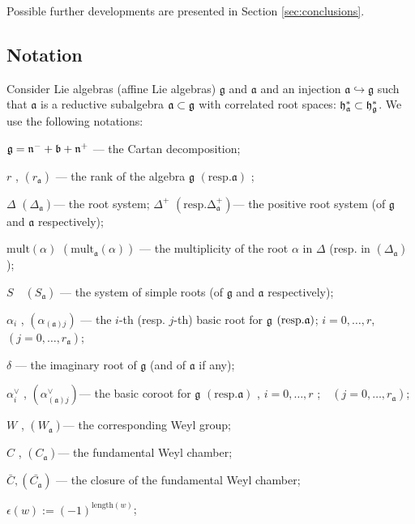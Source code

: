 \documentclass[12pt]{article}
\theoremstyle{definition}
\newcommand{\gf}{\mathfrak{g}}
\newcommand{\af}{\mathfrak{a}}
\begin{document}
Possible further developments are presented in Section \ref{sec:conclusions}.

\subsection{Notation}

\label{sec:notation}

Consider Lie algebras (affine Lie algebras) $\gf$ and $\af$ and an
injection $\af\hookrightarrow \gf$ such that $\af$ is a
reductive subalgebra $\frak{a\subset g}$ with correlated root spaces: $\frak{%
h}_{\af}^{\ast }\subset \frak{h}_{\gf}^{\ast }$. We use the
following notations:

$\frak{g=n}^{-}+\frak{b}+\frak{n}^{+}$ --- the Cartan decomposition;

$r$ , $\left( r_{\af}\right) $ --- the rank of the algebra $\gf$ $%
\left( \mathrm{{resp. }\af}\right) $ ;

$\Delta $ $\left( \Delta _{\af}\right) $--- the root system; $\Delta
^{+} $ $\left( \mathrm{{resp. }\Delta _{\af}^{+}}\right) $--- the
positive root system (of $\gf$ and $\af$ respectively);

$\mathrm{mult}\left( \alpha \right) $ $\left( \mathrm{mult}_{\af}\left(
\alpha \right) \right) $ --- the multiplicity of the root $\alpha$ in $%
\Delta $ (resp. in $\left( \Delta _{\af}\right) $);

$S\quad \left( S_{\af}\right) $ --- the system of simple roots (of $%
\gf$ and $\af$ respectively);

$\alpha _{i}$ , $\left( \alpha _{\left( \af\right) j}\right) $ --- the $%
i$-th (resp. $j$-th) basic root for $\gf$ $\left( \mathrm{{resp.}\frak{a%
}}\right) $; $i=0,\ldots ,r$,\ \ $\left( j=0,\ldots ,r_{\af}\right) $;

$\delta $ --- the imaginary root of $\gf$ (and of $\af$ if any);

$\alpha _{i}^{\vee }$ , $\left( \alpha _{\left( \af\right) j}^{\vee
}\right) $--- the basic coroot for $\gf$ $\left( \mathrm{{resp.}\af%
}\right) $ , $i=0,\ldots ,r$ ;\ \ $\left( j=0,\ldots ,r_{\af}\right) $;

$W$ , $\left( W_{\af}\right) $--- the corresponding Weyl group;

$C$ , $\left( C_{\af}\right) $--- the fundamental Weyl chamber;

$\bar{C}, \left(\bar{C_{\af}}\right)$ --- the closure of the
fundamental Weyl chamber;

$\epsilon \left( w\right) :=\left( -1\right) ^{\mathrm{length}(w)}$;
\end{document}

